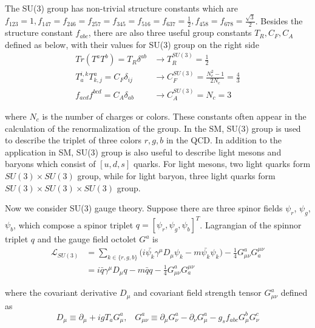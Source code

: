 \noindent The SU(3) group has non-trivial structure constants which are $f_{123}=1, f_{147}= f_{246}=f_{257}= f_{345}= f_{516}= f_{637}=\frac{1}{2}, f_{458} = f_{678}=\frac{\sqrt{3}}{2}$. Besides the structure constant $f_{abc}$, there are also three useful group constants $T_R, C_F, C_A$ defined as below, with their values for SU(3) group on the right side
%
\begin{align}
	Tr(T^aT^b)=T_R \delta^{ab}  &\longrightarrow  T_R^{SU(3)}  = \frac{1}{2} \\
    T_a^{i,k}T^a_{k,j} = C_F \delta_{ij}  &\longrightarrow  C_F^{SU(3)} = \frac{N_c^2-1}{2N_c} = \frac{4}{3} \\
    f_{acd}f^{bcd} = C_A \delta_{ab} &\longrightarrow C_A^{SU(3)}  =N_c = 3
\end{align}

\noindent where $N_c$ is the number of charges or colors. These constants often appear in the calculation of the renormalization of the group. In the SM, SU(3) group is used to describe the triplet of three colors $r,g,b$ in the QCD. In addition to the application in SM, SU(3) group is also useful to describe light mesons and baryons which consist of $[u,d,s]$ quarks. For light mesons, two light quarks form $SU(3) \times SU(3)$ group, while for light baryon, three light quarks form $SU(3) \times SU(3) \times SU(3)$ group.


\noindent Now we consider SU(3) gauge theory. Suppose there are three spinor fields $\psi_r$, $\psi_g$, $\psi_b$, which compose a spinor triplet $q = [ \psi_r, \psi_g, \psi_b ]^T$. Lagrangian of the spinnor triplet $q$ and the gauge field octolet $G^a$ is
\begin{equation}
\begin{split}
    \mathcal{L}_{SU(3)}  &= \sum_{k \in \{r,g,b\}} \big( i\bar{\psi_k}\gamma^\mu D_\mu \psi_k  - m\bar{\psi_k} \psi_k \big) - \frac{1}{4}G^a_{\mu\nu}G^{\mu\nu}_a \\
    &= i\bar{q}\gamma^\mu D_\mu q  - m\bar{q} q - \frac{1}{4}G^a_{\mu\nu}G^{\mu\nu}_a
\end{split}
\label{eqn:relatedWorks:qft:su3Lagrangian}
\end{equation}

\noindent where the covariant derivative $D_\mu$ and covariant field strength tensor $G^a_{\mu\nu}$ defined as
\begin{equation}
    D_\mu \equiv \partial_\mu +i g T_a G^a_\mu , \;\;\; 
    G^a_{\mu\nu} \equiv \partial_\mu G^a_\nu - \partial_\nu G^a_\mu - g_s f_{abc} G^b_\mu G^c_\nu
    \label{eqn:relatedWorks:qft:su3Covariant}
\end{equation}

